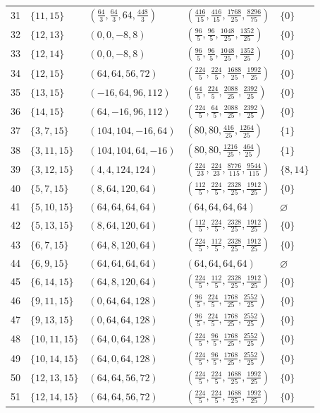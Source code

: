 \documentclass[11pt,a4paper]{article}
\theoremstyle{definition}\newtheorem{definition}[theorem]{Definition}
\theoremstyle{remark}\newtheorem{remark}[theorem]{Remark}
\newcommand{\1}{\mathbf 1}
\begin{document}
\begin{longtable}{@{}r l l l l@{}}
31 & $\{11,15\}$ & $(\frac{64}{3},\frac{64}{3},64,\frac{448}{3})$ & $(\frac{416}{15},\frac{416}{15},\frac{1768}{25},\frac{8296}{75})$ & $\{0\}$\\
32 & $\{12,13\}$ & $(0,0,-8,8)$ & $(\frac{96}{5},\frac{96}{5},\frac{1048}{25},\frac{1352}{25})$ & $\{0\}$\\
33 & $\{12,14\}$ & $(0,0,-8,8)$ & $(\frac{96}{5},\frac{96}{5},\frac{1048}{25},\frac{1352}{25})$ & $\{0\}$\\
34 & $\{12,15\}$ & $(64,64,56,72)$ & $(\frac{224}{5},\frac{224}{5},\frac{1688}{25},\frac{1992}{25})$ & $\{0\}$\\
35 & $\{13,15\}$ & $(-16,64,96,112)$ & $(\frac{64}{5},\frac{224}{5},\frac{2088}{25},\frac{2392}{25})$ & $\{0\}$\\
36 & $\{14,15\}$ & $(64,-16,96,112)$ & $(\frac{224}{5},\frac{64}{5},\frac{2088}{25},\frac{2392}{25})$ & $\{0\}$\\
37 & $\{3,7,15\}$ & $(104,104,-16,64)$ & $(80,80,\frac{416}{25},\frac{1264}{25})$ & $\{1\}$\\
38 & $\{3,11,15\}$ & $(104,104,64,-16)$ & $(80,80,\frac{1216}{25},\frac{464}{25})$ & $\{1\}$\\
39 & $\{3,12,15\}$ & $(4,4,124,124)$ & $(\frac{224}{23},\frac{224}{23},\frac{8776}{115},\frac{9544}{115})$ & $\{8,14\}$\\
40 & $\{5,7,15\}$ & $(8,64,120,64)$ & $(\frac{112}{5},\frac{224}{5},\frac{2328}{25},\frac{1912}{25})$ & $\{0\}$\\
41 & $\{5,10,15\}$ & $(64,64,64,64)$ & $(64,64,64,64)$ & $\varnothing$\\
42 & $\{5,13,15\}$ & $(8,64,120,64)$ & $(\frac{112}{5},\frac{224}{5},\frac{2328}{25},\frac{1912}{25})$ & $\{0\}$\\
43 & $\{6,7,15\}$ & $(64,8,120,64)$ & $(\frac{224}{5},\frac{112}{5},\frac{2328}{25},\frac{1912}{25})$ & $\{0\}$\\
44 & $\{6,9,15\}$ & $(64,64,64,64)$ & $(64,64,64,64)$ & $\varnothing$\\
45 & $\{6,14,15\}$ & $(64,8,120,64)$ & $(\frac{224}{5},\frac{112}{5},\frac{2328}{25},\frac{1912}{25})$ & $\{0\}$\\
46 & $\{9,11,15\}$ & $(0,64,64,128)$ & $(\frac{96}{5},\frac{224}{5},\frac{1768}{25},\frac{2552}{25})$ & $\{0\}$\\
47 & $\{9,13,15\}$ & $(0,64,64,128)$ & $(\frac{96}{5},\frac{224}{5},\frac{1768}{25},\frac{2552}{25})$ & $\{0\}$\\
48 & $\{10,11,15\}$ & $(64,0,64,128)$ & $(\frac{224}{5},\frac{96}{5},\frac{1768}{25},\frac{2552}{25})$ & $\{0\}$\\
49 & $\{10,14,15\}$ & $(64,0,64,128)$ & $(\frac{224}{5},\frac{96}{5},\frac{1768}{25},\frac{2552}{25})$ & $\{0\}$\\
50 & $\{12,13,15\}$ & $(64,64,56,72)$ & $(\frac{224}{5},\frac{224}{5},\frac{1688}{25},\frac{1992}{25})$ & $\{0\}$\\
51 & $\{12,14,15\}$ & $(64,64,56,72)$ & $(\frac{224}{5},\frac{224}{5},\frac{1688}{25},\frac{1992}{25})$ & $\{0\}$\\
\bottomrule\end{longtable}\endgroup
\end{document}
